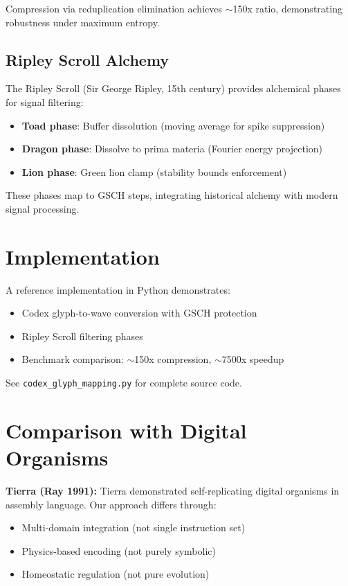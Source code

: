 \documentclass[11pt,a4paper]{article}
\begin{document}
Compression via reduplication elimination achieves $\sim$150x ratio, demonstrating robustness under maximum entropy.

\subsection{Ripley Scroll Alchemy}

The Ripley Scroll (Sir George Ripley, 15th century) provides alchemical phases for signal filtering:
\begin{itemize}
    \item \textbf{Toad phase}: Buffer dissolution (moving average for spike suppression)
    \item \textbf{Dragon phase}: Dissolve to prima materia (Fourier energy projection)
    \item \textbf{Lion phase}: Green lion clamp (stability bounds enforcement)
\end{itemize}

These phases map to GSCH steps, integrating historical alchemy with modern signal processing.

\section{Implementation}

A reference implementation in Python demonstrates:
\begin{itemize}
    \item Codex glyph-to-wave conversion with GSCH protection
    \item Ripley Scroll filtering phases
    \item Benchmark comparison: $\sim$150x compression, $\sim$7500x speedup
\end{itemize}

See \texttt{codex\_glyph\_mapping.py} for complete source code.

\section{Comparison with Digital Organisms}

\textbf{Tierra (Ray 1991):} Tierra \cite{tierra} demonstrated self-replicating digital organisms in assembly language. Our approach differs through:
\begin{itemize}
    \item Multi-domain integration (not single instruction set)
    \item Physics-based encoding (not purely symbolic)
    \item Homeostatic regulation (not pure evolution)
\end{itemize}
\end{document}
